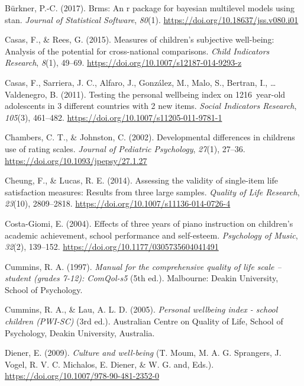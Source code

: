 \documentclass[a4, 12pt]{article}
\begin{document}
\leavevmode\hypertarget{ref-Buerkner2017}{}%
Bürkner, P.-C. (2017). Brms: An r package for bayesian multilevel models using stan. \emph{Journal of Statistical Software}, \emph{80}(1). \url{https://doi.org/10.18637/jss.v080.i01}

\leavevmode\hypertarget{ref-Casas2015}{}%
Casas, F., \& Rees, G. (2015). Measures of children's subjective well-being: Analysis of the potential for cross-national comparisons. \emph{Child Indicators Research}, \emph{8}(1), 49--69. \url{https://doi.org/10.1007/s12187-014-9293-z}

\leavevmode\hypertarget{ref-Casas2011}{}%
Casas, F., Sarriera, J. C., Alfaro, J., González, M., Malo, S., Bertran, I., \ldots{} Valdenegro, B. (2011). Testing the personal wellbeing index on 1216~year-old adolescents in 3 different countries with 2 new items. \emph{Social Indicators Research}, \emph{105}(3), 461--482. \url{https://doi.org/10.1007/s11205-011-9781-1}

\leavevmode\hypertarget{ref-Johnston2002}{}%
Chambers, C. T., \& Johnston, C. (2002). Developmental differences in childrens use of rating scales. \emph{Journal of Pediatric Psychology}, \emph{27}(1), 27--36. \url{https://doi.org/10.1093/jpepsy/27.1.27}

\leavevmode\hypertarget{ref-Cheung2014}{}%
Cheung, F., \& Lucas, R. E. (2014). Assessing the validity of single-item life satisfaction measures: Results from three large samples. \emph{Quality of Life Research}, \emph{23}(10), 2809--2818. \url{https://doi.org/10.1007/s11136-014-0726-4}

\leavevmode\hypertarget{ref-CostaGiomi2004}{}%
Costa-Giomi, E. (2004). Effects of three years of piano instruction on children's academic achievement, school performance and self-esteem. \emph{Psychology of Music}, \emph{32}(2), 139--152. \url{https://doi.org/10.1177/0305735604041491}

\leavevmode\hypertarget{ref-Cummins1997}{}%
Cummins, R. A. (1997). \emph{Manual for the comprehensive quality of life scale -- student (grades 7-12): ComQol-s5} (5th ed.). Malbourne: Deakin University, School of Psychology.

\leavevmode\hypertarget{ref-Cummins2005}{}%
Cummins, R. A., \& Lau, A. L. D. (2005). \emph{Personal wellbeing index - school children (PWI-SC)} (3rd ed.). Australian Centre on Quality of Life, School of Psychology, Deakin University, Australia.

\leavevmode\hypertarget{ref-Diener2009}{}%
Diener, E. (2009). \emph{Culture and well-being} (T. Moum, M. A. G. Sprangers, J. Vogel, R. V. C. Michalos, E. Diener, \& W. G. and, Eds.). \url{https://doi.org/10.1007/978-90-481-2352-0}
\end{document}
